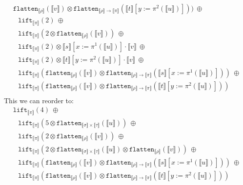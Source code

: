\documentclass[a4paper,UKenglish,cleveref,autoref,numberwithinsect]{lipics-v2019}
\theoremstyle{definition}
\newcommand{\arrtype}{\rightarrow}
\newcommand{\flatten}{\mathtt{flatten}}
\newcommand{\lift}{\mathtt{lift}}
\newcommand{\typeinterpret}[1]{\llbracket #1 \rrbracket}
\newcommand{\interpret}[1]{\llbracket #1 \rrbracket}
\begin{document}
\begin{itemize}
\[\begin{array}{l}
    \flatten_{\typeinterpret{\rho}}(\interpret{v}) \otimes
    \flatten_{\typeinterpret{\rho} \arrtype \typeinterpret{\pi}}(
    \interpret{t}[y:=\pi^2(\interpret{u})]))\ \oplus \\
  \phantom{A}
  \lift_{\typeinterpret{\pi}}(2)\ \oplus \\
  \phantom{A}
  \lift_{\typeinterpret{\pi}}(2 \otimes \flatten_{
    \typeinterpret{\rho}}(\interpret{v}))\ \oplus \\
  \phantom{A}
  \lift_{\typeinterpret{\pi}}(2) \otimes \interpret{s}[x:=\pi^1(
    \interpret{u})] \cdot \interpret{v}\ \oplus \\
  \phantom{A}
  \lift_{\typeinterpret{\pi}}(2) \otimes \interpret{t}[y:=\pi^2(
    \interpret{u})] \cdot \interpret{v}\ \oplus \\
  \phantom{A}
  \lift_{\typeinterpret{\pi}}(
    \flatten_{\typeinterpret{\rho}}(\interpret{v}) \otimes
    \flatten_{\typeinterpret{\rho} \arrtype \typeinterpret{\pi}}(
    \interpret{s}[x:=\pi^1(\interpret{u})]))\ \oplus \\
  \phantom{A}
  \lift_{\typeinterpret{\pi}}(
    \flatten_{\typeinterpret{\rho}}(\interpret{v}) \otimes
    \flatten_{\typeinterpret{\rho} \arrtype
    \typeinterpret{\pi}}(\interpret{t}[y:=\pi^2(\interpret{u})])) \\
  \end{array}
  \]
  This we can reorder to:
  \[
  \begin{array}{l}
  \lift_{\typeinterpret{\pi}}(4)\ \oplus \\
  \phantom{A}
  \lift_{\typeinterpret{\pi}}(5 \otimes \flatten_{\typeinterpret{\sigma}
    \times \typeinterpret{\tau}}(\interpret{u}))\ \oplus \\
  \phantom{A}
  \lift_{\typeinterpret{\pi}}(2 \otimes \flatten_{
    \typeinterpret{\rho}}(\interpret{v}))\ \oplus \\
  \phantom{A}
  \lift_{\typeinterpret{\pi}}(2 \otimes
    \flatten_{\typeinterpret{\sigma} \times
    \typeinterpret{\tau}}(\interpret{u}) \otimes
    \flatten_{\typeinterpret{\rho}}(\interpret{v}))\ \oplus \\
  \phantom{A}
  \lift_{\typeinterpret{\pi}}(
    \flatten_{\typeinterpret{\rho}}(\interpret{v}) \otimes
    \flatten_{\typeinterpret{\rho} \arrtype \typeinterpret{\pi}}(
    \interpret{s}[x:=\pi^1(\interpret{u})]))\ \oplus \\
  \phantom{A}
  \lift_{\typeinterpret{\pi}}(
    \flatten_{\typeinterpret{\rho}}(\interpret{v}) \otimes
    \flatten_{\typeinterpret{\rho} \arrtype
    \typeinterpret{\pi}}(\interpret{t}[y:=\pi^2(\interpret{u})]))\

\end{array}\]
\end{itemize}
\end{document}
